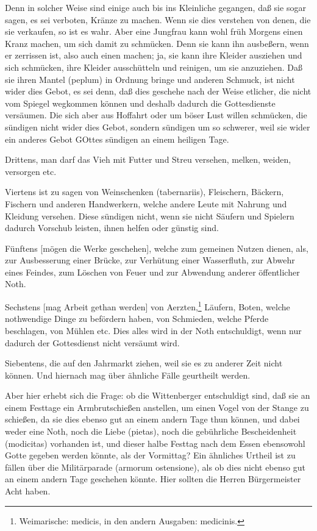 Denn in solcher Weise sind einige auch bis ins Kleinliche gegangen, daß sie sogar sagen, es sei verboten, Kränze zu machen. Wenn sie dies verstehen von denen, die sie verkaufen, so ist es wahr. Aber eine Jungfrau kann wohl früh Morgens einen Kranz machen, um sich damit zu schmücken. Denn sie kann ihn ausbeßern, wenn er zerrissen ist, also auch einen machen; ja, sie kann ihre Kleider ausziehen und sich schmücken, ihre Kleider ausschütteln und reinigen, um sie anzuziehen. Daß sie ihren Mantel (peplum) in Ordnung bringe und anderen Schmuck, ist nicht wider dies Gebot, es sei denn, daß dies geschehe nach der Weise etlicher, die nicht vom Spiegel wegkommen können und deshalb dadurch die Gottesdienste versäumen. Die sich aber aus Hoffahrt oder um böser Lust willen schmücken, die sündigen nicht wider dies Gebot, sondern sündigen um so schwerer, weil sie wider ein anderes Gebot GOttes sündigen an einem heiligen Tage.

Drittens, man darf das Vieh mit Futter und Streu versehen, melken, weiden, versorgen etc.

Viertens ist zu sagen von Weinschenken (tabernariis), Fleischern, Bäckern, Fischern und anderen Handwerkern, welche andere Leute mit Nahrung und Kleidung versehen. Diese sündigen nicht, wenn sie nicht Säufern und Spielern dadurch Vorschub leisten, ihnen helfen oder günstig sind.

Fünftens [mögen die Werke geschehen], welche zum gemeinen Nutzen dienen, als, zur Ausbesserung einer Brücke, zur Verhütung einer Wasserfluth, zur Abwehr eines Feindes, zum Löschen von Feuer und zur Abwendung anderer öffentlicher Noth.

Sechstens [mag Arbeit gethan werden] von Aerzten,\footnote{Weimarische: medicis, in den andern Ausgaben: medicinis.} Läufern, Boten, welche nothwendige Dinge zu befördern haben, von Schmieden, welche Pferde beschlagen, von Mühlen etc. Dies alles wird in der Noth entschuldigt, wenn nur dadurch der Gottesdienst nicht versäumt wird.

Siebentens, die auf den Jahrmarkt ziehen, weil sie es zu anderer Zeit nicht können. Und hiernach mag über ähnliche Fälle geurtheilt werden.

Aber hier erhebt sich die Frage: ob die Wittenberger entschuldigt sind, daß sie an einem Festtage ein Armbrutschießen anstellen, um einen Vogel von der Stange zu schießen, da sie dies ebenso gut an einem andern Tage thun können, und dabei weder eine Noth, noch die Liebe (pietas), noch die gebührliche Bescheidenheit (modicitas) vorhanden ist, und dieser halbe Festtag nach dem Essen ebensowohl Gotte gegeben werden könnte, als der Vormittag? Ein ähnliches Urtheil ist zu fällen über die Militärparade (armorum ostensione), als ob dies nicht ebenso gut an einem andern Tage geschehen könnte. Hier sollten die Herren Bürgermeister Acht haben.


